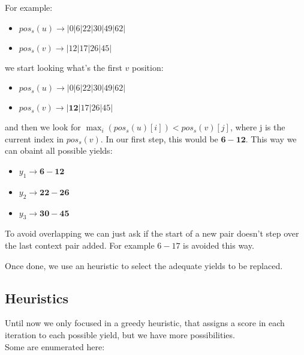 For example: 

\begin{center}
	\begin{itemize}
		\item $pos_s(u)\rightarrow |0|6|22|30|49|62|$
		\item $pos_s(v)\rightarrow |12|17|26|45|$
	\end{itemize}
\end{center}

we start looking what's the first $v$ position:

\begin{center}
	\begin{itemize}
		\item $pos_s(u)\rightarrow |0|6|22|30|49|62|$
		\item $pos_s(v)\rightarrow |\bm{12}|17|26|45|$
	\end{itemize}
\end{center}

and then we look for $\max_i (pos_s(u)[i]) < pos_s(v)[j]$, where j is the current index in $pos_s(v)$. In our first step, this would be $\bm{6-12}$. 
This way we can obaint all possible yields:
\begin{center}
	\begin{itemize}
		\item $y_1 \rightarrow \bm{6-12}$
		\item $y_2 \rightarrow \bm{22-26}$
		\item $y_3 \rightarrow \bm{30-45}$
	\end{itemize}
\end{center}

To avoid overlapping we can just ask if the start of a new pair doesn't step over
the last context pair added. For example $6-17$ is avoided this way.

Once done, we use an heuristic to select the adequate yields to be replaced.

\subsection{Heuristics}

Until now we only focused in a greedy heuristic, that assigns a score in each 
iteration to each possible yield, but we have more possibilities. \\

Some are enumerated here: \\

